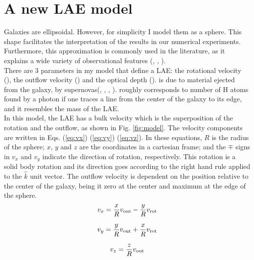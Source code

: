 \setcounter{equation}{0}
\chapter{A new LAE model}
\label{chap:model}

Galaxies are ellipsoidal. However, for simplicity I model them as a sphere. This shape facilitates the interpretation of the results in our numerical experiments. Furthermore, this approximation is commonly used in the literature, as it explains a wide variety of observational features (\cite{Ahn03}, \cite{Verhamme06}, \cite{Dijkstra06}). \\

There are 3 parameters in my model that define a LAE: the rotational velocity (\vrot), the outflow velocity (\vout) and the optical depth (\tauh). \vout is due to material ejected from the galaxy, by supernovas(\cite{Verhamme06}, \cite{Orsi12}, \cite{Hashimoto2015}, \cite{Gronke2015}). \tauh roughly corresponds to number of H atoms found by a \lya photon if one traces a line from the center of the galaxy to its edge, and it resembles the mass of the LAE.\\

In this model, the LAE has a bulk velocity which is the superposition of the rotation and the outflow, as shown in Fig. \ref{fig:model}. The velocity components are written in Eqs. (\ref{eq:vx}) (\ref{eq:vy}) (\ref{eq:vz}). In these equations, $R$ is the radius of the sphere; $x$, $y$ and $z$ are the coordinates in a cartesian frame; and the $\mp$ signs in $v_x$ and $v_y$ indicate the direction of rotation, respectively. This rotation is a solid body rotation and its direction goes according to the right hand rule applied to the $\hat{k}$ unit vector. The outflow velocity is dependent on the position relative to the center of the galaxy, being it zero at the center and maximum at the edge of the sphere.\\

\begin{equation}
v_{x}=\frac{x}{R}v_{\rm out}-\frac{y}{R}v_{\rm rot} 
\label{eq:vx}
\end{equation}

\begin{equation}
v_{y}=\frac{y}{R}v_{\rm out}+\frac{x}{R}v_{\rm rot} 
\label{eq:vy}
\end{equation}

\begin{equation}
v_{z}=\frac{z}{R}v_{\rm out}
\label{eq:vz}
\end{equation}

